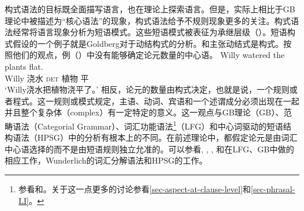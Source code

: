 \noindent
构式语法的目标既全面描写语言，也在理论上探索语言。但是，实际上相比于GB理论中被描述为“核心语法”的现象，构式语法给予不规则现象更多的关注。构式语法经常将语言现象分析为短语模式。这些短语模式被表征为承继层级（\egc \citealp{Croft2001a,Goldberg2003a}）。短语构式假设的一个例子就是Goldberg对于动结构式的分析。\citet{Goldberg95a}和\citet{GJ2004a}主张动结式是构式。按照他们的观点，例（）中没有能够确定论元数量的中心语。
%
\ea
\gll Willy watered the plants flat.\\
	 Willy 浇水 \textsc{det} 植物 平\\
\glt `Willy浇水把植物浇平了。'
\z
相反，论元的数量由构式决定，也就是说，一个规则或者程式。这一规则或模式规定，主语、动词、宾语和一个述谓成分必须出现在一起并且整个复杂体（complex）有一定特定的意义。这一观点与GB理论\indexgbc（GB）、范畴语法\indexcgc（Categorial Grammar）、词汇功能语法\footnote{参看和。关于这一点更多的讨论参看\ref{sec-aspect-at-clause-level}和\ref{sec-phrasal-LI}。%
}\indexlfgc（LFG）和中心词驱动的短语结构语法\indexhpsgc（HPSG）中的分析有根本上的不同。在前述理论中，都假定论元是由词汇中心语选择的而不是由短语规则独立允准的。可以参看, , , 和在LFG、GB中做的相应工作，Wunderlich的词汇分解语法和HPSG的工作。

